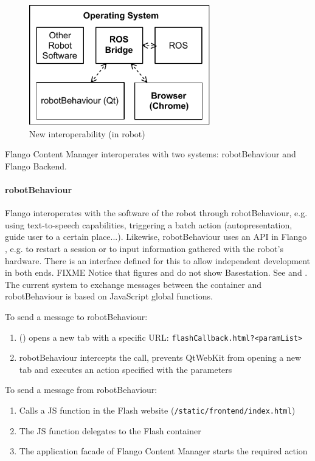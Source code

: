 \begin{figure}[htb]
    \centering
    \includegraphics[width=0.7\textwidth]{figures/interoperability-new}
    \caption{New interoperability (in robot)}
    \label{fig:interoperability-new}
\end{figure}

Flango Content Manager interoperates with two systems: robotBehaviour and Flango Backend.

\paragraph{robotBehaviour} Flango \cm interoperates with the software of the robot through robotBehaviour, e.g. using text-to-speech capabilities, triggering a batch action (autopresentation, guide user to a certain place...).
Likewise, robotBehaviour uses an \ac{API} in Flango \cm, e.g. to restart a session or to input information gathered with the robot's hardware.
There is an interface defined for this to allow independent development in both ends.
FIXME Notice that figures  and  do not show Basestation. See  and .
The current system to exchange messages between the \flash container and robotBehaviour is based on JavaScript global functions.

To send a message to robotBehaviour:
\begin{enumerate}
    \item \cm (\flash) opens a new tab with a specific \ac{URL}: \texttt{flashCallback.html?\textless paramList\textgreater}
    \item robotBehaviour intercepts the call, prevents QtWebKit from opening a new tab and executes an action specified with the parameters
\end{enumerate}

To send a message from robotBehaviour:
\begin{enumerate}
    \item Calls a \ac{JS} function in the Flash website (\texttt{/static/frontend/index.html})
    \item The \ac{JS} function delegates to the Flash container
    \item The application facade of Flango Content Manager starts the required action
\end{enumerate}


